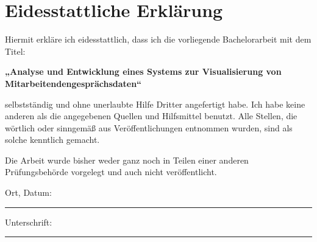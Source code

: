 \chapter*{Eidesstattliche Erklärung}

Hiermit erkläre ich eidesstattlich, dass ich die vorliegende Bachelorarbeit mit dem Titel:

\vspace{0.5cm}

\textbf{„Analyse und Entwicklung eines
Systems zur Visualisierung von
Mitarbeitendengesprächsdaten“}

\vspace{0.5cm}

selbstständig und ohne unerlaubte Hilfe Dritter angefertigt habe. Ich habe keine anderen als die angegebenen Quellen und Hilfsmittel benutzt. Alle Stellen, die wörtlich oder sinngemäß aus Veröffentlichungen entnommen wurden, sind als solche kenntlich gemacht.

Die Arbeit wurde bisher weder ganz noch in Teilen einer anderen Prüfungsbehörde vorgelegt und auch nicht veröffentlicht.

\vspace{2cm}

\noindent
Ort, Datum: \rule{4cm}{0.2pt} \hfill 
Unterschrift: \rule{4cm}{0.2pt}
